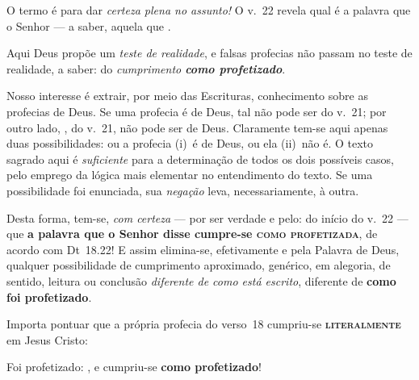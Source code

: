 
    O termo  é para dar \emph{certeza plena no assunto!} O v.~22 revela qual é a palavra que o Senhor  --- a saber, aquela que .

    Aqui Deus propõe um \emph{teste de  realidade},  e  falsas  profecias  não  passam  no  teste  de  realidade,  a  saber:  do
    \emph{cumprimento \textbf{como profetizado}}.

    Nosso interesse é extrair, por meio das Escrituras, conhecimento sobre as profecias de Deus. Se uma profecia é de Deus,  tal
    não pode ser  do v.~21; por outro lado, ,
    do v.~21, não pode ser de Deus. Claramente tem-se aqui apenas duas possibilidades: ou a  profecia  (i)~é  de  Deus,  ou  ela
    (ii)~não é. O texto sagrado aqui é \emph{suficiente} para a determinação de todos os dois possíveis casos, pelo  emprego  da
    lógica  mais  elementar  no  entendimento  do  texto.  Se  uma  possibilidade  foi  enunciada,  sua   \emph{negação}   leva,
    necessariamente, à outra.

    Desta forma, tem-se, \emph{com certeza} --- por ser verdade e pelo:  do início do v.~22 ---  que  \textbf{a
    palavra que o Senhor disse cumpre-se \textsc{como profetizada}}, de acordo com Dt~18.22! E assim elimina-se, efetivamente  e
    pela Palavra de Deus, qualquer possibilidade de cumprimento aproximado,  genérico,  em  alegoria,  de  sentido,  leitura  ou
    conclusão \emph{diferente de como está escrito}, diferente de \textbf{como foi profetizado}.

    Importa pontuar que a própria profecia do verso~18 cumpriu-se \textbf{\textsc{literalmente}} em Jesus Cristo:
 

    Foi profetizado: , e cumpriu-se \textbf{como profetizado}!


